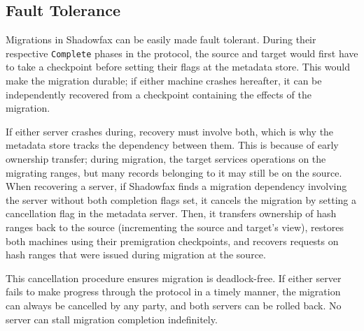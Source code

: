 \subsection{Fault Tolerance}
\label{sec:fault-tolerance}

Migrations in Shadowfax can be easily made fault tolerant.
%
During their
respective \texttt{Complete} phases in the protocol,
the source and target would first have to take a checkpoint before
setting their flags at the metadata store.
%
This would make the migration durable;
%
if either machine crashes hereafter, it can be independently recovered
from a checkpoint containing the effects of the migration.

If either server crashes during, recovery must involve both, which is why the
metadata store tracks the dependency between them.
%
This is because of early ownership transfer; during migration, the
target services operations on the migrating ranges, but many records belonging
to it may still be on the source.
%
When recovering a server, if Shadowfax finds a migration dependency
involving the server without both completion flags set, it cancels the
migration by setting a cancellation flag in the metadata server.
%
Then, it transfers ownership of hash ranges back to the source
(incrementing the source and target's view), restores both machines using
their premigration checkpoints, and recovers requests on hash
ranges that were issued during migration at the source.

This cancellation procedure ensures migration is deadlock-free.
%
If either server fails to make progress through the protocol
in a timely manner, the migration can always be cancelled by any party, and
both servers can be rolled back.
%
No server can stall migration completion indefinitely.

%
%
%
